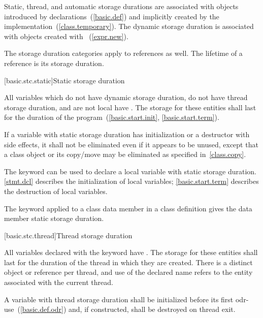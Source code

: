 \pnum
{}%
%
%
%
Static, thread, and automatic storage durations are associated with objects
introduced by declarations~(\ref{basic.def}) and implicitly created by
the implementation~(\ref{class.temporary}). The dynamic storage duration
is associated with objects created with 
~(\ref{expr.new}).

\pnum
The storage duration categories apply to references as well. The
lifetime of a reference is its storage duration.

[basic.stc.static]{Static storage duration}

\pnum
{}%
All variables which do not have dynamic storage duration, do not have thread
storage duration, and are not local
have . The
storage for these entities shall last for the duration of the
program~(\ref{basic.start.init}, \ref{basic.start.term}).

\pnum
If a variable with static storage duration has initialization or a
destructor with side effects, it shall not be eliminated even if it
appears to be unused, except that a class object or its copy/move may be
eliminated as specified in~\ref{class.copy}.

\pnum
{}%
The keyword  can be used to declare a local variable with
static storage duration. \enternote \ref{stmt.dcl} describes the
initialization of local  variables; \ref{basic.start.term}
describes the destruction of local  variables. \exitnote

\pnum
{}%
The keyword  applied to a class data member in a class
definition gives the data member static storage duration.

[basic.stc.thread]{Thread storage duration}

\pnum
{}%
All variables declared with the  keyword have . The storage for these entities shall last for the duration of
the thread in which they are created. There is a distinct object or reference
per thread, and use of the declared name refers to the entity associated with
the current thread.

\pnum
A variable with thread storage duration shall be initialized before
its first odr-use~(\ref{basic.def.odr}) and, if constructed, shall be destroyed on thread exit.

